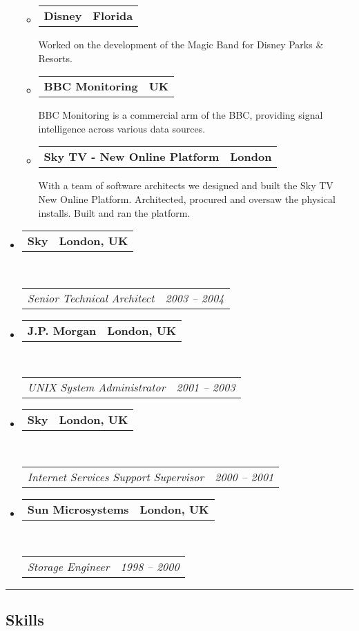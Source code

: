 \documentclass[10pt,a4paper]{article}
\makeatletter
\newcommand{\headerrow}[2]
{\begin{tabular*}{\linewidth}{l@{\extracolsep{\fill}}r}
	#1 &
	#2 \\
\end{tabular*}}
\makeatother
\begin{document}
\begin{itemize}
\begin{itemize}
					\item
          \headerrow
              {\textbf{Disney}}
              {\textbf{Florida}}
              Worked on the development of the Magic Band for Disney Parks \& Resorts.

					\item
          \headerrow
              {\textbf{BBC Monitoring}}
              {\textbf{UK}}
              BBC Monitoring is a commercial arm of the BBC, providing signal intelligence across various data sources.

				\item
				\headerrow
						{\textbf{Sky TV - New Online Platform}}
						{\textbf{London}}
						With a team of software architects we designed and built the Sky TV New Online Platform.  Architected, procured and oversaw the physical installs.  Built and ran the platform.


			\end{itemize}

	\item
	\headerrow
		{\textbf{Sky}}
		{\textbf{London, UK}}
	\\
	\headerrow
		{\emph{Senior Technical Architect}}
		{\emph{2003 -- 2004}}

	\item
	\headerrow
		{\textbf{J.P. Morgan}}
		{\textbf{London, UK}}
	\\
	\headerrow
		{\emph{UNIX System Administrator}}
		{\emph{2001 -- 2003}}

	\item
	\headerrow
		{\textbf{Sky}}
		{\textbf{London, UK}}
	\\
	\headerrow
		{\emph{Internet Services Support Supervisor}}
		{\emph{2000 -- 2001}}

	\item
	\headerrow
		{\textbf{Sun Microsystems}}
		{\textbf{London, UK}}
	\\
	\headerrow
		{\emph{Storage Engineer}}
		{\emph{1998 -- 2000}}
\end{itemize}


\hrule
\vspace{-0.4em}
\subsection*{Skills}
\end{document}

